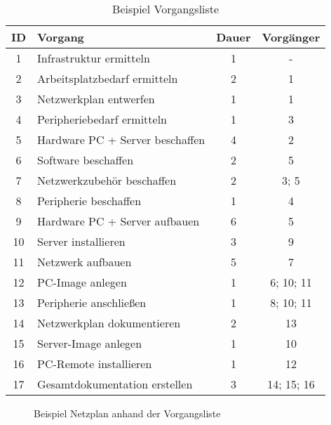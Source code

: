 \begin{table}
    [H]
    \centering
    \begin{tabular}{|c|l|c|c|}
        \hline
        \textbf{ID} & \textbf{Vorgang}                & \textbf{Dauer} & \textbf{Vorgänger} \\\hline
        1           & Infrastruktur ermitteln         & 1              & -                  \\\hline
        2           & Arbeitsplatzbedarf ermitteln    & 2              & 1                  \\\hline
        3           & Netzwerkplan entwerfen          & 1              & 1                  \\\hline
        4           & Peripheriebedarf ermitteln      & 1              & 3                  \\\hline
        5           & Hardware PC + Server beschaffen & 4              & 2                  \\\hline
        6           & Software beschaffen             & 2              & 5                  \\\hline
        7           & Netzwerkzubehör beschaffen      & 2              & 3; 5               \\\hline
        8           & Peripherie beschaffen           & 1              & 4                  \\\hline
        9           & Hardware PC + Server aufbauen   & 6              & 5                  \\\hline
        10          & Server installieren             & 3              & 9                  \\\hline
        11          & Netzwerk aufbauen               & 5              & 7                  \\\hline
        12          & PC-Image anlegen                & 1              & 6; 10; 11          \\\hline
        13          & Peripherie anschließen          & 1              & 8; 10; 11          \\\hline
        14          & Netzwerkplan dokumentieren      & 2              & 13                 \\\hline
        15          & Server-Image anlegen            & 1              & 10                 \\\hline
        16          & PC-Remote installieren          & 1              & 12                 \\\hline 17 & Gesamtdokumentation erstellen & 3 & 14; 15; 16 \\\hline
    \end{tabular}
    \caption{Beispiel Vorgangsliste}
\end{table}

\begin{figure}[H]
    \centering
    
    \caption{Beispiel Netzplan anhand der Vorgangsliste}
\end{figure}
\FloatBarrier